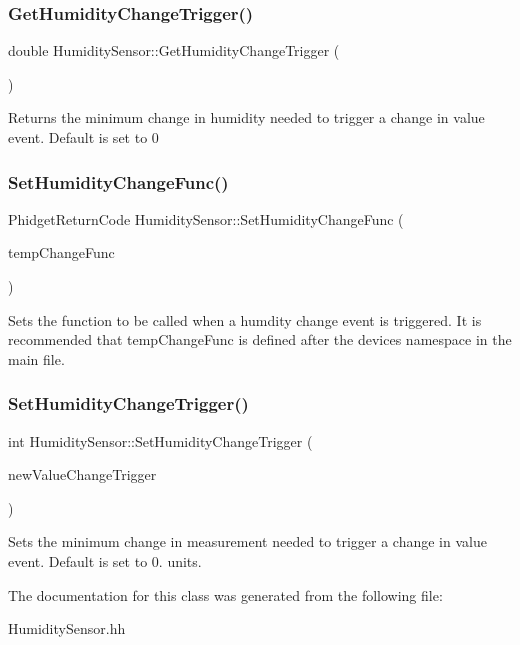 \subsubsection{\texorpdfstring{Get\+Humidity\+Change\+Trigger()}{GetHumidityChangeTrigger()}}
{\footnotesize\ttfamily double Humidity\+Sensor\+::\+Get\+Humidity\+Change\+Trigger (\begin{DoxyParamCaption}{ }\end{DoxyParamCaption})\hspace{0.3cm}{\ttfamily [inline]}}

Returns the minimum change in humidity needed to trigger a change in value event. Default is set to 0\mbox{\label{classHumiditySensor_a8ceff441668925dab38fecb150879160}} 
\subsubsection{\texorpdfstring{Set\+Humidity\+Change\+Func()}{SetHumidityChangeFunc()}}
{\footnotesize\ttfamily Phidget\+Return\+Code Humidity\+Sensor\+::\+Set\+Humidity\+Change\+Func (\begin{DoxyParamCaption}\item[{Phidget\+Humidity\+Sensor\+\_\+\+On\+Humidity\+Change\+Callback}]{temp\+Change\+Func }\end{DoxyParamCaption})\hspace{0.3cm}{\ttfamily [inline]}}

Sets the function to be called when a humdity change event is triggered. It is recommended that temp\+Change\+Func is defined after the devices namespace in the main file.\mbox{\label{classHumiditySensor_aedd8316be052bfbda8b882b61ad46a0b}} 
\subsubsection{\texorpdfstring{Set\+Humidity\+Change\+Trigger()}{SetHumidityChangeTrigger()}}
{\footnotesize\ttfamily int Humidity\+Sensor\+::\+Set\+Humidity\+Change\+Trigger (\begin{DoxyParamCaption}\item[{double}]{new\+Value\+Change\+Trigger }\end{DoxyParamCaption})\hspace{0.3cm}{\ttfamily [inline]}}

Sets the minimum change in measurement needed to trigger a change in value event. Default is set to 0. units.

The documentation for this class was generated from the following file\+:\begin{DoxyCompactItemize}
\item 
Humidity\+Sensor.\+hh\end{DoxyCompactItemize}
